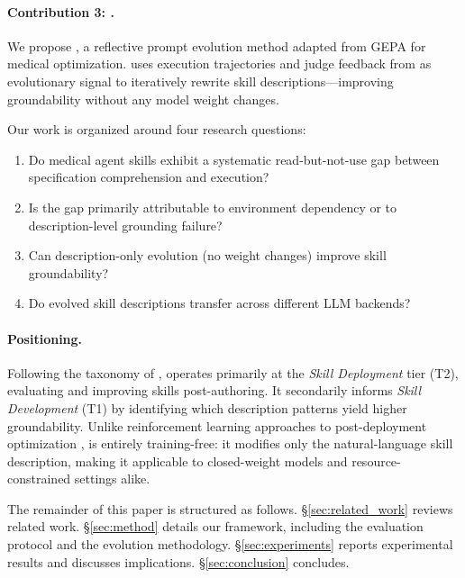 \paragraph{Contribution 3: \gepamed.}
We propose \gepamed, a reflective prompt evolution method adapted from GEPA \citep{gepa2025} for medical \skillmd optimization.
\gepamed uses execution trajectories and judge feedback from \medskillbench as evolutionary signal to iteratively rewrite skill descriptions---improving groundability without any model weight changes.

Our work is organized around four research questions:
\begin{enumerate}[nosep,leftmargin=*,label=\textbf{RQ\arabic*:}]
    \item Do medical agent skills exhibit a systematic read-but-not-use gap between specification comprehension and execution?
    \item Is the gap primarily attributable to environment dependency or to description-level grounding failure?
    \item Can description-only evolution (no weight changes) improve skill groundability?
    \item Do evolved skill descriptions transfer across different LLM backends?
\end{enumerate}

\paragraph{Positioning.}
Following the taxonomy of \citet{skillsbench2026}, \medskille operates primarily at the \emph{Skill Deployment} tier (T2), evaluating and improving skills post-authoring.
It secondarily informs \emph{Skill Development} (T1) by identifying which description patterns yield higher groundability.
Unlike reinforcement learning approaches to post-deployment optimization \citep{tracefree2026}, \medskille is entirely training-free: it modifies only the natural-language skill description, making it applicable to closed-weight models and resource-constrained settings alike.

The remainder of this paper is structured as follows.
\S\ref{sec:related_work} reviews related work.
\S\ref{sec:method} details our framework, including the \medskillbench evaluation protocol and the \gepamed evolution methodology.
\S\ref{sec:experiments} reports experimental results and discusses implications.
\S\ref{sec:conclusion} concludes.

